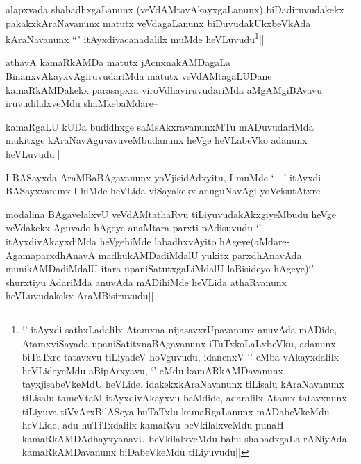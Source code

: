 
\begin{artha}
alapxvada shabadhxgaLanunx (veVdAMtavAkayxgaLanunx) biDadiruvudakekx pakakxkAraNavanunx matutx veVdagaLanunx biDuvudakUkxbeVkAda kAraNavanunx ``\stext" itAyxdivacanadalilx muMde heVLuvudu\footnote{`\stext' itAyxdi sathxLadalilx Atamxna nijasavxrUpavanunx anuvAda mADide, AtamxviSayada upaniSatitxnaBAgavanunx iTuTxkoLaLxbeVku, adanunx biTaTxre tatavxvu tiLiyadeV hoVguvudu, idanenxV `\stext' eMba vAkayxdalilx heVLideyeMdu aBipArxyavu, `\stext' eMdu kamARkAMDavanunx tayxjisabeVkeMdU heVLide. idakekxkAraNavanunx tiLisalu kAraNavanunx tiLisalu tameVtaM itAyxdivAkayxvu baMdide, adaralilx Atamx tatavxnunx tiLiyuva tiVvArxBilASeya huTaTxlu kamaRgaLanunx mADabeVkeMdu heVLide, adu huTiTxdalilx kamaRvu beVkilalxveMdu punaH kamaRkAMDAdhayxyanavU beVkilalxveMdu bahu shabadxgaLa rANiyAda kamaRkAMDavanunx biDabeVkeMdu tiLiyuvudu||}||
\end{artha}


\begin{artha}
athavA kamaRkAMDa matutx jAcnxnakAMDagaLa BinanxvAkayxvAgiruvudariMda matutx veVdAMtagaLUDane kamaRkAMDakekx parasapxra viroVdhaviruvudariMda aMgAMgiBAvavu iruvudilalxveMdu shaMkebaMdare--
\end{artha}


\begin{artha}
kamaRgaLU kUDa budidhxge saMsAkxravanunxMTu mADuvudariMda mukitxge kAraNavAguvavuveMbudanunx heVge heVLabeVko adanunx heVLuvudu||
\end{artha}

\begin{artha}
I BASayxda AraMBaBAgavanunx yoVjisidAdxyitu, I muMde `\stext---' itAyxdi BASayxvanunx I hiMde heVLida viSayakekx anuguNavAgi yoVcisutAtxre--
\end{artha}


\begin{artha}
modalina BAgavelalxvU veVdAMtathaRvu tiLiyuvudakAkxgiyeMbudu heVge veVdakekx Aguvado hAgeye anaMtara parxti pAdisuvudu `\stext' itAyxdivAkayxdiMda heVgehiMde labadhxvAyito hAgeye(aMdare- AgamaparxdhAnavA madhukAMDadiMdalU yukitx parxdhAnavAda munikAMDadiMdalU itara upaniSatutxgaLiMdalU laBisideyo hAgeye)`\stext' shurxtiyu AdariMda anuvAda mADihiMde heVLida athaRvanunx heVLuvudakekx AraMBisiruvudu||
\end{artha}

